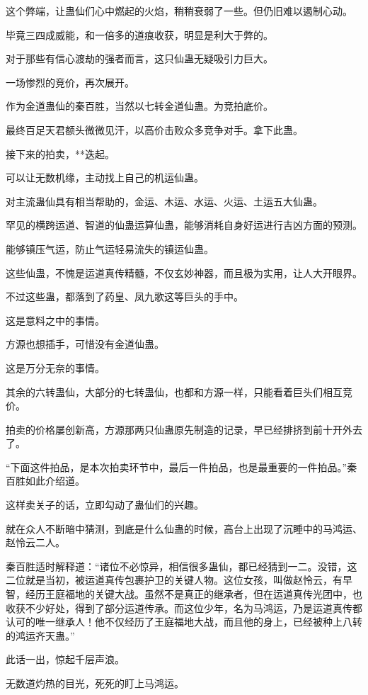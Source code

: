 \begin{this_body}
这个弊端，让蛊仙们心中燃起的火焰，稍稍衰弱了一些。但仍旧难以遏制心动。

毕竟三四成威能，和一倍多的道痕收获，明显是利大于弊的。

对于那些有信心渡劫的强者而言，这只仙蛊无疑吸引力巨大。

一场惨烈的竞价，再次展开。

作为金道蛊仙的秦百胜，当然以七转金道仙蛊。为竞拍底价。

最终百足天君额头微微见汗，以高价击败众多竞争对手。拿下此蛊。

接下来的拍卖，**迭起。

可以让无数机缘，主动找上自己的机运仙蛊。

对主流蛊仙具有相当帮助的，金运、木运、水运、火运、土运五大仙蛊。

罕见的横跨运道、智道的仙蛊运算仙蛊，能够消耗自身好运进行吉凶方面的预测。

能够镇压气运，防止气运轻易流失的镇运仙蛊。

这些仙蛊，不愧是运道真传精髓，不仅玄妙神器，而且极为实用，让人大开眼界。

不过这些蛊，都落到了药皇、凤九歌这等巨头的手中。

这是意料之中的事情。

方源也想插手，可惜没有金道仙蛊。

这是万分无奈的事情。

其余的六转蛊仙，大部分的七转蛊仙，也都和方源一样，只能看着巨头们相互竞价。

拍卖的价格屡创新高，方源那两只仙蛊原先制造的记录，早已经排挤到前十开外去了。

“下面这件拍品，是本次拍卖环节中，最后一件拍品，也是最重要的一件拍品。”秦百胜如此介绍道。

这样卖关子的话，立即勾动了蛊仙们的兴趣。

就在众人不断暗中猜测，到底是什么仙蛊的时候，高台上出现了沉睡中的马鸿运、赵怜云二人。

秦百胜适时解释道：“诸位不必惊异，相信很多蛊仙，都已经猜到一二。没错，这二位就是当初，被运道真传包裹护卫的关键人物。这位女孩，叫做赵怜云，有早智，经历王庭福地的关键大战。虽然不是真正的继承者，但在运道真传光团中，也收获不少好处，得到了部分运道传承。而这位少年，名为马鸿运，乃是运道真传都认可的唯一继承人！他不仅经历了王庭福地大战，而且他的身上，已经被种上八转的鸿运齐天蛊。”

此话一出，惊起千层声浪。

无数道灼热的目光，死死的盯上马鸿运。


\end{this_body}
